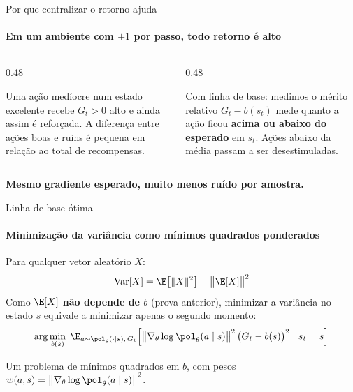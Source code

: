 \documentclass[aspectratio=169, 11pt]{beamer}
\newcommand{\Var}{\operatorname{Var}}
\begin{document}
\begin{frame}{Por que centralizar o retorno ajuda}
  \framesubtitle{Em um ambiente com $+1$ por passo, todo retorno é alto}

  \begin{columns}[T]
    \begin{column}{0.48\textwidth}
      \begin{exbox}[title={Sem linha de base: o sinal bom some}]{}
        \small Uma ação medíocre num estado excelente recebe $G_t > 0$ alto e ainda
        assim é reforçada. A diferença entre ações boas e ruins é pequena em relação
        ao total de recompensas.
      \end{exbox}
    \end{column}
    \begin{column}{0.48\textwidth}
      \begin{teobox}{Com linha de base: medimos o mérito relativo}
        \small $G_t - b(s_t)$ mede quanto a ação ficou \textbf{acima ou abaixo do esperado}
        em $s_t$. Ações abaixo da média passam a ser desestimuladas.
      \end{teobox}
    \end{column}
  \end{columns}

  \vspace{0.8em}
  \begin{center}
    \textbf{Mesmo gradiente esperado, muito menos ruído por amostra.}
  \end{center}
\end{frame}

\begin{frame}{Linha de base ótima}
  \framesubtitle{Minimização da variância como mínimos quadrados ponderados}

  Para qualquer vetor aleatório $X$:
  \[
    \Var[X] = \E\big[\|X\|^2\big] - \big\|\E[X]\big\|^2
  \]
  Como $\E[X]$ \textbf{não depende de $b$} (prova anterior), minimizar a variância no estado $s$
  equivale a minimizar apenas o segundo momento:
  \[
    \arg\min_{b(s)}\;\E_{a\sim\pol_\theta(\cdot\mid s),\,G_t}\Big[\big\|\nabla_\theta\log\pol_\theta(a\mid s)\big\|^2\,
      \big(G_t-b(s)\big)^2\;\Big|\;s_t=s\Big]
  \]

  \begin{ideiabox}
    Um problema de mínimos quadrados em $b$, com pesos
    $w(a,s) = \big\|\nabla_\theta\log\pol_\theta(a\mid s)\big\|^2$.
  \end{ideiabox}
\end{frame}
\end{document}
